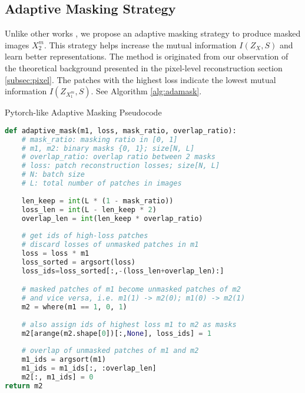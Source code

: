 \documentclass[10pt,twocolumn,letterpaper]{article}
\begin{document}
\subsection{Adaptive Masking Strategy} \label{subsec:adamask}
Unlike other works \cite{mae,simmim,data2vec,beit}, we propose an adaptive masking strategy to produce masked images $X_2^m$. This strategy helps increase the mutual information $I(Z_X,S)$ and learn better representations. The method is originated from our observation of the theoretical background presented in the pixel-level reconstruction section \ref{subsec:pixel}. The patches with the highest loss indicate the lowest mutual information $I(Z_{X_1^m},S)$. See Algorithm \ref{alg:adamask}.
\begin{algorithm}[t]
\caption{Pytorch-like Adaptive Masking Pseudocode}
\label{alg:adamask}
\small
\begin{lstlisting}[language=python]
def adaptive_mask(m1, loss, mask_ratio, overlap_ratio):
    # mask_ratio: masking ratio in [0, 1]
    # m1, m2: binary masks {0, 1}; size[N, L]
    # overlap_ratio: overlap ratio between 2 masks
    # loss: patch reconstruction losses; size[N, L]
    # N: batch size
    # L: total number of patches in images
    
    len_keep = int(L * (1 - mask_ratio)) 
    loss_len = int(L - len_keep * 2) 
    overlap_len = int(len_keep * overlap_ratio) 
    
    # get ids of high-loss patches
    # discard losses of unmasked patches in m1
    loss = loss * m1 
    loss_sorted = argsort(loss)
    loss_ids=loss_sorted[:,-(loss_len+overlap_len):]

    # masked patches of m1 become unmasked patches of m2
    # and vice versa, i.e. m1(1) -> m2(0); m1(0) -> m2(1)
    m2 = where(m1 == 1, 0, 1)
    
    # also assign ids of highest loss m1 to m2 as masks
    m2[arange(m2.shape[0])[:,None], loss_ids] = 1
    
    # overlap of unmasked patches of m1 and m2
    m1_ids = argsort(m1)
    m1_ids = m1_ids[:, :overlap_len]
    m2[:, m1_ids] = 0
return m2
\end{lstlisting}
\end{algorithm}
\end{document}
